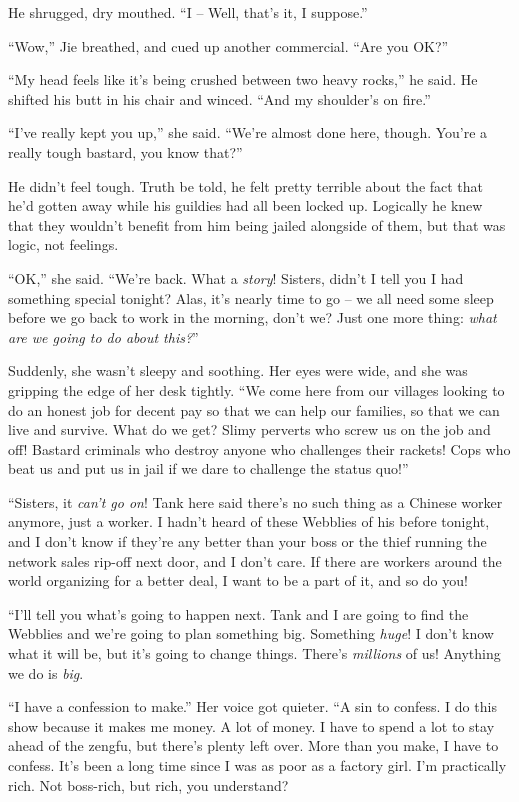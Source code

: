 He shrugged, dry mouthed. ``I -- Well, that's it, I suppose.''

``Wow,'' Jie breathed, and cued up another commercial. ``Are you OK?''

``My head feels like it's being crushed between two heavy rocks,'' he
said. He shifted his butt in his chair and winced. ``And my
shoulder's on fire.''

``I've really kept you up,'' she said. ``We're almost done here,
though. You're a really tough bastard, you know that?''

He didn't feel tough. Truth be told, he felt pretty terrible about
the fact that he'd gotten away while his guildies had all been
locked up. Logically he knew that they wouldn't benefit from him
being jailed alongside of them, but that was logic, not feelings.

``OK,'' she said. ``We're back. What a \emph{story}! Sisters, didn't I
tell you I had something special tonight? Alas, it's nearly time to
go -- we all need some sleep before we go back to work in the
morning, don't we? Just one more thing:
\emph{what are we going to do about this?}''

Suddenly, she wasn't sleepy and soothing. Her eyes were wide, and
she was gripping the edge of her desk tightly. ``We come here from
our villages looking to do an honest job for decent pay so that we
can help our families, so that we can live and survive. What do we
get? Slimy perverts who screw us on the job and off! Bastard
criminals who destroy anyone who challenges their rackets! Cops who
beat us and put us in jail if we dare to challenge the status
quo!''

``Sisters, it \emph{can't go on}! Tank here said there's no such
thing as a Chinese worker anymore, just a worker. I hadn't heard of
these Webblies of his before tonight, and I don't know if they're
any better than your boss or the thief running the network sales
rip-off next door, and I don't care. If there are workers around
the world organizing for a better deal, I want to be a part of it,
and so do you!

``I'll tell you what's going to happen next. Tank and I are going to
find the Webblies and we're going to plan something big. Something
\emph{huge}! I don't know what it will be, but it's going to change
things. There's \emph{millions} of us! Anything we do is
\emph{big}.

``I have a confession to make.'' Her voice got quieter. ``A sin to
confess. I do this show because it makes me money. A lot of money.
I have to spend a lot to stay ahead of the zengfu, but there's
plenty left over. More than you make, I have to confess. It's been
a long time since I was as poor as a factory girl. I'm practically
rich. Not boss-rich, but rich, you understand?


